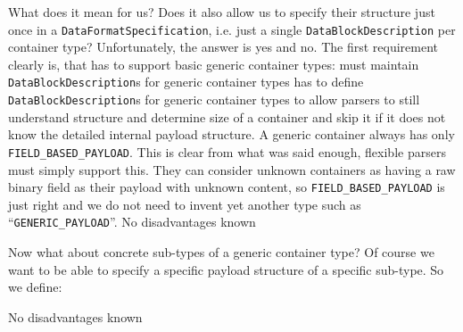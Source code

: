 What does it mean for us? Does it also allow us to specify their structure just once in a \texttt{DataFormatSpecification}, i.e. just a single \texttt{DataBlockDescription} per container type? Unfortunately, the answer is yes and no. The first requirement clearly is, that \LibName{} has to support basic generic container types:
{%
\COMPdataFormatManagement{} must maintain \texttt{DataBlockDescription}s for generic container types
}
{%
\COMPdataFormatManagement{} has to define \texttt{DataBlockDescription}s for generic container types to allow parsers to still understand structure and determine size of a container and skip it if it does not know the detailed internal payload structure. A generic container always has only \texttt{FIELD\_BASED\_PAYLOAD}.
}
{%
This is clear from what was said enough, flexible parsers must simply support this. They can consider unknown containers as having a raw binary field as their payload with unknown content, so \texttt{FIELD\_BASED\_PAYLOAD} is just right and we do not need to invent yet another type such as ``\texttt{GENERIC\_PAYLOAD}''.
}
{%
No disadvantages known
}

Now what about concrete sub-types of a generic container type? Of course we want to be able to specify a specific payload structure of a specific sub-type. So we define:
{%

}
{%

}
{%

}
{%
No disadvantages known
}


%
%
